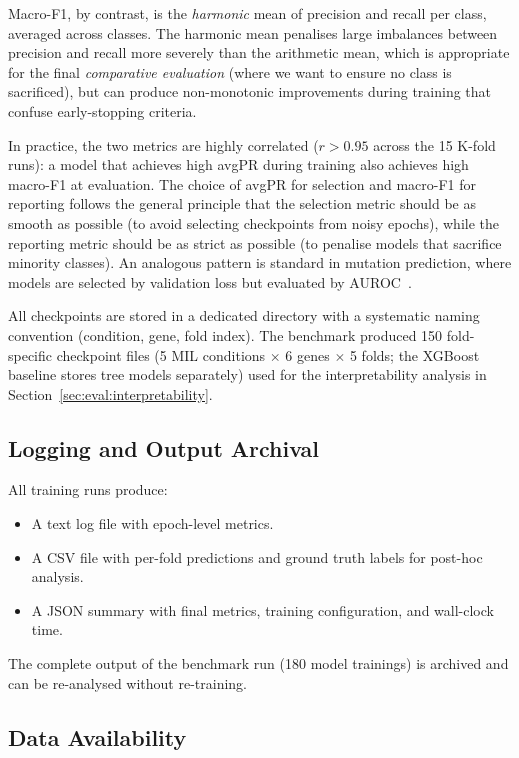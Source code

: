 Macro-F1, by contrast, is the \emph{harmonic} mean of precision and
recall per class, averaged across classes.
The harmonic mean penalises large imbalances between precision and
recall more severely than the arithmetic mean, which is appropriate
for the final \emph{comparative evaluation} (where we want to ensure
no class is sacrificed), but can produce non-monotonic improvements
during training that confuse early-stopping criteria.

In practice, the two metrics are highly correlated
($r > 0.95$ across the 15 K-fold runs): a model that achieves high
avgPR during training also achieves high macro-F1 at evaluation.
The choice of avgPR for selection and macro-F1 for reporting follows
the general principle that the selection metric should be as smooth
as possible (to avoid selecting checkpoints from noisy epochs),
while the reporting metric should be as strict as possible
(to penalise models that sacrifice minority classes).
An analogous pattern is standard in mutation prediction, where models
are selected by validation loss but evaluated by
AUROC~\cite{coudray2018classification}.

All checkpoints are stored in a dedicated directory with a
systematic naming convention (condition, gene, fold index).
The benchmark produced 150 fold-specific checkpoint files
(5 MIL conditions $\times$ 6 genes $\times$ 5 folds; the XGBoost
baseline stores tree models separately) used for the
interpretability analysis in
Section~\ref{sec:eval:interpretability}.


\subsection{Logging and Output Archival}
\label{sec:impl:repro:logging}

All training runs produce:
\begin{itemize}
    \item A text log file with epoch-level metrics.
    \item A CSV file with per-fold predictions and ground truth labels
    for post-hoc analysis.
    \item A JSON summary with final metrics, training configuration,
    and wall-clock time.
\end{itemize}

The complete output of the benchmark run (180 model trainings) is archived and can be re-analysed without re-training.

\subsection{Data Availability}
\label{sec:impl:repro:data}

